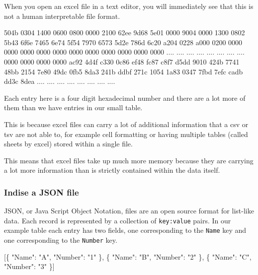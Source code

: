 \documentclass[
  12pt,
]{book}
\newenvironment{Shaded}{\begin{snugshade}}{\end{snugshade}}
\newcommand{\DataTypeTok}[1]{\textcolor[rgb]{0.13,0.29,0.53}{#1}}
\newcommand{\FunctionTok}[1]{\textcolor[rgb]{0.00,0.00,0.00}{#1}}
\newcommand{\NormalTok}[1]{#1}
\newcommand{\OtherTok}[1]{\textcolor[rgb]{0.56,0.35,0.01}{#1}}
\newcommand{\StringTok}[1]{\textcolor[rgb]{0.31,0.60,0.02}{#1}}
\begin{document}
When you open an excel file in a text editor, you will immediately see that this is not a human interpretable file format.

\begin{Shaded}
\begin{Highlighting}[]
\NormalTok{504b 0304 1400 0600 0800 0000 2100 62ee}
\NormalTok{9d68 5e01 0000 9004 0000 1300 0802 5b43}
\NormalTok{6f6e 7465 6e74 5f54 7970 6573 5d2e 786d}
\NormalTok{6c20 a204 0228 a000 0200 0000 0000 0000}
\NormalTok{0000 0000 0000 0000 0000 0000 0000 0000}
\NormalTok{.... .... .... .... .... .... .... ....}
\NormalTok{0000 0000 0000 0000 ac92 4d4f c330 0c86}
\NormalTok{ef48 fc87 c8f7 d5dd 9010 424b 7741 48bb}
\NormalTok{2154 7e80 49dc 0fb5 8da3 241b ddbf 271c}
\NormalTok{1054 1a83 0347 7fbd 7efc cadb dd3c 8dea}
\NormalTok{.... .... .... .... .... .... .... ....}
\end{Highlighting}
\end{Shaded}

Each entry here is a four digit hexadecimal number and there are a lot more of them than we have entries in our small table.

This is because excel files can carry a lot of additional information that a csv or tsv are not able to, for example cell formatting or having multiple tables (called sheets by excel) stored within a single file.

This means that excel files take up much more memory because they are carrying a lot more information than is strictly contained within the data itself.

\hypertarget{indise-a-json-file}{%
\subsubsection{Indise a JSON file}\label{indise-a-json-file}}

JSON, or Java Script Object Notation, files are an open source format for list-like data. Each record is represented by a collection of \texttt{key:value} pairs. In our example table each entry has two fields, one corresponding to the \texttt{Name} key and one corresponding to the \texttt{Number} key.

\begin{Shaded}
\begin{Highlighting}[]
\OtherTok{[}\FunctionTok{\{}
    \DataTypeTok{"Name"}\FunctionTok{:} \StringTok{"A"}\FunctionTok{,}
    \DataTypeTok{"Number"}\FunctionTok{:} \StringTok{"1"}
\FunctionTok{\}}\OtherTok{,} \FunctionTok{\{}
    \DataTypeTok{"Name"}\FunctionTok{:} \StringTok{"B"}\FunctionTok{,}
    \DataTypeTok{"Number"}\FunctionTok{:} \StringTok{"2"}
\FunctionTok{\}}\OtherTok{,} \FunctionTok{\{}
    \DataTypeTok{"Name"}\FunctionTok{:} \StringTok{"C"}\FunctionTok{,}
    \DataTypeTok{"Number"}\FunctionTok{:} \StringTok{"3"}
\FunctionTok{\}}\OtherTok{]}
\end{Highlighting}
\end{Shaded}
\end{document}
